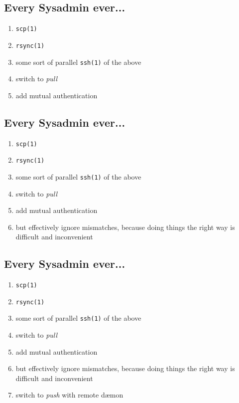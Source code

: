\documentclass[xga]{xdvislides}
\begin{document}
\subsection{Every Sysadmin ever...}
\begin{enumerate}
	\item {\tt scp(1)}
	\item {\tt rsync(1)}
	\item some sort of parallel {\tt ssh(1)} of the above
	\item switch to {\em pull}
	\item add mutual authentication
\end{enumerate}

\subsection{Every Sysadmin ever...}
\begin{enumerate}
	\item {\tt scp(1)}
	\item {\tt rsync(1)}
	\item some sort of parallel {\tt ssh(1)} of the above
	\item switch to {\em pull}
	\item add mutual authentication
	\item but effectively ignore mismatches, because doing things the right way is difficult and inconvenient
\end{enumerate}

\subsection{Every Sysadmin ever...}
\begin{enumerate}
	\item {\tt scp(1)}
	\item {\tt rsync(1)}
	\item some sort of parallel {\tt ssh(1)} of the above
	\item switch to {\em pull}
	\item add mutual authentication
	\item but effectively ignore mismatches, because doing things the right way is difficult and inconvenient
	\item switch to {\em push} with remote d\ae mon
\end{enumerate}
\end{document}
